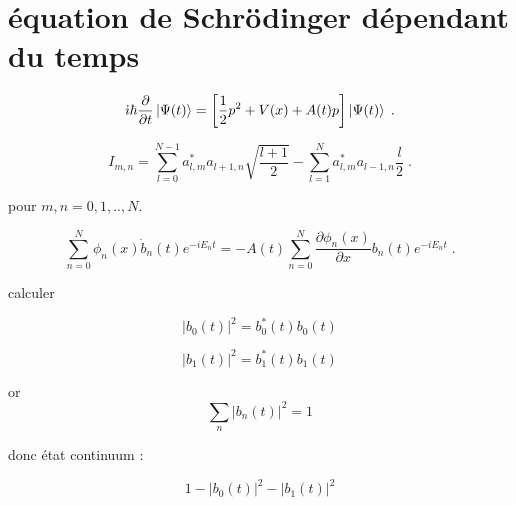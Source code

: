 \documentclass{report}
\begin{document}
\section{équation de Schrödinger dépendant du temps}

$$\dot{\imath}\hbar\frac{\partial}{\partial t}\ket{\Psi(t)}=\left[\frac{1}{2}p^2+ V(x)+A(t)p\right]\ket{\Psi(t)}\;.$$

\begin{equation}
I_{m,n}= \sum_{l=0}^{N-1}a^\ast_{l,m}a_{l+1,n}\sqrt{\frac{l+1}{2}}-\sum_{l=1}^{N}a^\ast_{l,m}a_{l-1,n}\frac{l}{2}\;.
\end{equation}

pour $m,n = 0,1,..,N$.

\begin{equation}
\sum_{n=0}^{N}\phi_{n}(x)\dot{b}_{n}(t) e^{-iE_{n}t} = - A(t) \sum_{n=0}^{N}\frac{\partial \phi_{n}(x)}{\partial x}b_{n}(t) e^{-iE_{n}t}\;.
\end{equation}

calculer 

$$\left| b_{0}(t)\right|^2= b^\ast_0(t)b_0(t)$$

$$\left| b_{1}(t)\right|^2= b^\ast_1(t)b_1(t)$$

 
or
$$\sum_{n} \left| b_{n}(t)\right|^2 =1$$

donc état continuum :

$$1-\left| b_{0}(t)\right|^2-\left| b_{1}(t)\right|^2$$

\end{document}
